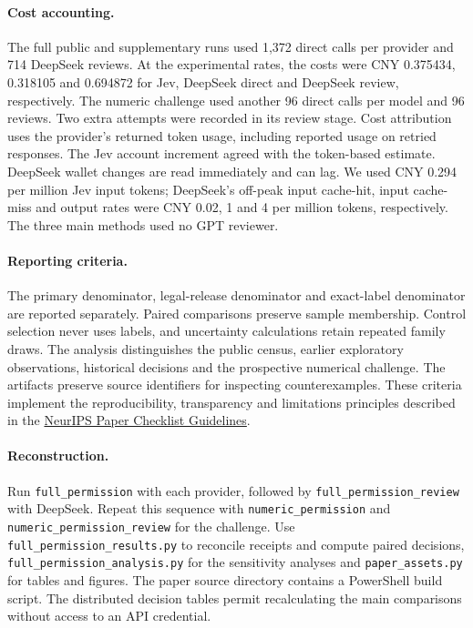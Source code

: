 \paragraph{Cost accounting.}
The full public and supplementary runs used 1,372 direct calls per provider and 714 DeepSeek reviews. At the experimental rates, the costs were CNY 0.375434, 0.318105 and 0.694872 for Jev, DeepSeek direct and DeepSeek review, respectively. The numeric challenge used another 96 direct calls per model and 96 reviews. Two extra attempts were recorded in its review stage. Cost attribution uses the provider's returned token usage, including reported usage on retried responses. The Jev account increment agreed with the token-based estimate. DeepSeek wallet changes are read immediately and can lag. We used CNY 0.294 per million Jev input tokens; DeepSeek's off-peak input cache-hit, input cache-miss and output rates were CNY 0.02, 1 and 4 per million tokens, respectively. The three main methods used no GPT reviewer.

\paragraph{Reporting criteria.}
The primary denominator, legal-release denominator and exact-label denominator are reported separately. Paired comparisons preserve sample membership. Control selection never uses labels, and uncertainty calculations retain repeated family draws. The analysis distinguishes the public census, earlier exploratory observations, historical decisions and the prospective numerical challenge. The artifacts preserve source identifiers for inspecting counterexamples. These criteria implement the reproducibility, transparency and limitations principles described in the \href{https://neurips.cc/public/guides/PaperChecklist}{NeurIPS Paper Checklist Guidelines}.

\paragraph{Reconstruction.}
Run \texttt{full\_permission} with each provider, followed by \texttt{full\_permission\_review} with DeepSeek. Repeat this sequence with \texttt{numeric\_permission} and \texttt{numeric\_permission\_review} for the challenge. Use \texttt{full\_permission\_results.py} to reconcile receipts and compute paired decisions, \texttt{full\_permission\_analysis.py} for the sensitivity analyses and \texttt{paper\_assets.py} for tables and figures. The paper source directory contains a PowerShell build script. The distributed decision tables permit recalculating the main comparisons without access to an API credential.

